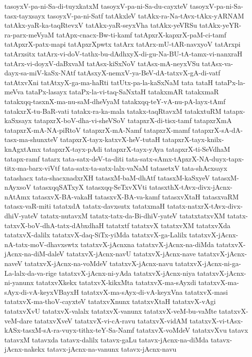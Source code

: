 {tasoyxV-pa-ni-Sa-di-tuyxkatxM
tasoyxV-pa-ni-Sa-du-cayxteV
tasoyxV-pa-ni-Sa-tasx-tayxsayx
tasoyxV-pa-ni-Satf
tatAkxleV
tatAkx-ra-Na-tAvx-tAkx-yARNAM
tatAkx-yaR-ka-taqRtevxV
tatAkx-yaR-seyxVha
tatAkx-yeVRSu
tatAkx-yeYR-ra-parx-meVyaM
tatApx-cnacx-Bw-ti-kamf
tatApxrX-kapxrX-paM-ci-tamf
tatApxrX-patx-mapi
tatApxrXpwtx
tatArx
tatArx-mU-tAR-navxyoV
tatArxpi
tatArxsitx
tatArx-vi-doV-tathx-bu-dAdhxyX-di-gu-Na-BU-tA-tamx-vi-nanxraH
tatArx-vi-doyxV-daBxvaM
tatAsx-kiSxNoV
tatAsx-mA-neyxVSu
tatAsx-va-dayx-sa-miV-kaSx-NAtf
tatAsxyX-nemxV-ya-BeV-dA-tatxvX-gA-di-vatf
tatAtxvXni
tatAtxyX-ga-ma-haRti
tatUtx-pa-la-kaSxNaM
tata
tataH
tataPx-la-meVva
tataPx-lasayx
tataPx-la-vi-taq-SaNxtaH
tatakxmAR
tatakxmaR
tatakxqq-tasxnX-ma-nu-saM-dheVyaM
tatakxqq-teY-vA-nu-pA-layx-tAmf
tatakxrX-tu-BaR-vati
tatakx-ra-ka-mala
tatakx-taqRtavxM
tatakxtuRM
tatapx-kaSxsayx
tatapxrX-boV-dha-vi-sheVSoV
tatapxrX-di-tisx-tamf
tatapxrXmA
tatapxrX-mA-NA-piRtoV
tatapxrX-mA-Namf
tatapxrX-mamf
tatapxrX-sA-dA-tasx-ma-shunxteV
tatapxrX-tayx-katxvX-heV-tutaH
tatapxrX-tayx-knilx-knAgxtAmx
tatapxrX-tayx-pAdi
tatapxrX-tayx-yAya
tatapxrX-ti-SeVdhaM
tatapx-ramf
tatarx
tata-satx-deV-ta-diti
tata-satx-sAmx-tApxrX-NA-duyx-tapx-titx-ma-barx-viVtf
tata-satx-ta-satx-lalx-vaNaM
tatasetxV
tata-shAcxsayx
tatashacx
tata-shacxnadxrXH
tatasxM-baM-dhAtf
tatasxM-kaSxyeV
tatasxM-nAyxsoV
tatasxqqSATxyX
tatasxqq-SeTxvXVti
tatasxthX-tAvx-divx-jAcnx-nAtAmx
tatasxvX-BA-vakaH
tatasxvX-BA-va-kamf
tatasxvXtaH
tatasxvaRM
tatasx-vaR-miti
tatatxdA
tatatx-davxsutx
tatatxmaH
tatatx-natxrX-tAvx-divx-dhiV-yateV
tatatx-nutavxM
tatatx-tatx-da-Bi-dhiV-yateV
tatatxtatxvXM
tatatx-tatxvX-boV-dhA-tatx-dAbxdhaH
tatatxtf
tatatxvX
tatatxvXM
tatatxvXda
tatatxvX-dalilx
tatatxvX-daq-SiTx-yiMda
tatatxvX-ga-Lalilx
tatatxvX-jAcnx-nA-tatx-moV-dhavxswtx
tatatxvX-jAcnxna
tatatxvX-jAcnx-na-diMda
tatatxvX-jAcnx-na-diM-daleV
tatatxvX-jAcnx-navU
tatatxvX-jAcnx-nave
tatatxvX-jAcnx-naveV
tatatxvX-jAcnx-na-voMdeV
tatatxvX-jAcnx-navu
tatatxvX-jAcnx-ni-ga-La-lalx-da-va-rige
tatatxvX-jAcnx-ni-yAda
tatatxvX-jAcnx-niya
tatatxvX-jAcnx-ni-yanunx
tatatxvXkekx
tatatxvX-kikxMta
tatatxvX-ma-sAyxdi
tatatxvX-ma-sAyx-di-vA-keyxVBayxH
tatatxvX-ma-sAyx-di-vA-keyxVna
tatatxvX-masi
tatatxvX-ma-thoV-cayxteV
tatatxvXnunx
tatatxvXtaH
tatatxvX-vAgi
tatatxvXvU
tatatxvX-valalx
tatatxvX-vanunx
tatatxvX-veM-bu-vaMte
tatatxvX-veM-dare
tatatxvXveV
tatatxvX-vi-cA-ravu
tatatxvX-vidAM
tatatxvX-vi-tAsx-kASx-tasxM-sA-ra-vuyx-tithx-teY-Sa-Namf
tatatxvX-voMdeV
tatatxvXvu
tatavx
tatavxM
tatavxda
tatavx-dalilx
tatavx-gaLu
tatavx-jAcnx-na-diMda
tatavx-jAcnx-nakekx
tatavx-jAcnx-na-vanunx
tatavx-jAcnx-navu
}
